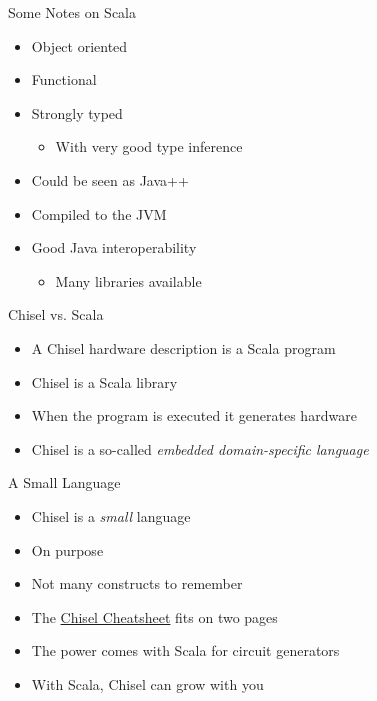 \begin{frame}[fragile]{Some Notes on Scala}
\begin{itemize}
\item Object oriented
\item Functional
\item Strongly typed
\begin{itemize}
\item With very good type inference
\end{itemize}
\item Could be seen as Java++
\item Compiled to the JVM
\item Good Java interoperability
\begin{itemize}
\item Many libraries available
\end{itemize}
\end{itemize}
\end{frame}

\begin{frame}[fragile]{Chisel vs. Scala}
\begin{itemize}
\item A Chisel hardware description is a Scala program
\item Chisel is a Scala library
\item When the program is executed it generates hardware
\item Chisel is a so-called \emph{embedded domain-specific language}
\end{itemize}
\end{frame}

\begin{frame}[fragile]{A Small Language}
\begin{itemize}
\item Chisel is a \emph{small} language
\item On purpose
\item Not many constructs to remember
\item The \href{https://github.com/freechipsproject/chisel-cheatsheet/releases/latest/download/chisel_cheatsheet.pdf}{Chisel Cheatsheet} fits on two pages
\item The power comes with Scala for circuit generators
\item With Scala, Chisel can grow with you
\end{itemize}
\end{frame}

